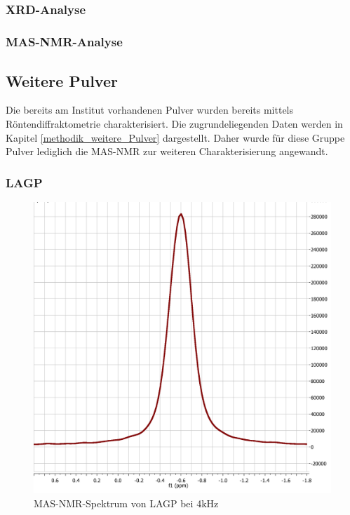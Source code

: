 \documentclass[a4paper, 11pt, headsepline,footsepline,twoside,abstract]{scrbook}
\begin{document}
\subsection{}
\subsubsection{XRD-Analyse}
\subsubsection{MAS-NMR-Analyse}
\subsection{Weitere Pulver}
Die bereits am Institut vorhandenen Pulver wurden bereits mittels Röntendiffraktometrie charakterisiert. Die zugrundeliegenden Daten werden in Kapitel \ref{methodik_weitere_Pulver} dargestellt. Daher wurde für diese Gruppe Pulver lediglich die MAS-NMR zur weiteren Charakterisierung angewandt.
\subsubsection{LAGP}
\begin{figure}
	\centering
	\includegraphics[width=1.0\columnwidth]{images/LAGP.png}
	\caption{MAS-NMR-Spektrum von LAGP bei 4kHz}
	\label{nmr_mas_LATP2}
\end{figure}
\end{document}

